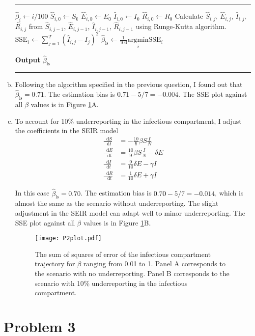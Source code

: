 \documentclass[12pt]{article}
\makeatletter
\newcommand*\diff{\mathop{}\!\mathrm{d}}
\newenvironment{breakablealgorithm}
{%
		\begin{center}
			\refstepcounter{algorithm}%
			\hrule height.8pt depth0pt \kern2pt%
			\renewcommand{\caption}[2][\relax]{%
				{\raggedright\textbf{\fname@algorithm~\thealgorithm} ##2\par}%
				\ifx\relax##1\relax %
				\addcontentsline{loa}{algorithm}{\protect\numberline{\thealgorithm}##2}%
				\else %
				\addcontentsline{loa}{algorithm}{\protect\numberline{\thealgorithm}##1}%
				\fi
				\kern2pt\hrule\kern2pt
			}
		}{%
		\kern2pt\hrule\relax%
	\end{center}
}
\makeatother
\begin{document}
\begin{enumerate}[(a)]
\begin{breakablealgorithm}
	\begin{algorithmic}[1]
		\State $\hat{\beta}_{i} \gets i/100$ 
		\State $\hat{S}_{i,0} \gets S_{0}$ 
		\State $\hat{E}_{i,0} \gets E_0$
		\State $\hat{I}_{i,0} \gets I_{0}$
		\State $\hat{R}_{i,0} \gets R_0$
				\State Calculate $\hat{S}_{i,j}$, $\hat{E}_{i,j}$, $\hat{I}_{i,j}$, $\hat{R}_{i,j}$ from $\hat{S}_{i,j-1}$, $\hat{E}_{i,j-1}$, $\hat{I}_{i,j-1}$, $\hat{R}_{i,j-1}$ using Runge-Kutta algorithm.
			\EndFor
		\State $\text{SSE}_{i} \gets \sum_{j=1}^{T} (\hat{I}_{i,j} - I_{j})^2$
		\EndFor
		\State $\hat{\beta}_\text{ls} \gets \frac{1}{100}\underset{i}{\mathrm{argmin}}\text{SSE}_{i}$	
	\end{algorithmic}
	
	\hspace*{\algorithmicindent} \textbf{Output} $\hat{\beta}_\text{ls}$
\end{breakablealgorithm}

	\item Following the algorithm specified in the previous question, I found out that $\hat{\beta}_\text{ls} = 0.71$. The estimation bias is $0.71 - 5/7 = -0.004$. The SSE plot against all $\beta$ values is in Figure \ref{p2}A.

	
	
	\item To account for 10\% underreporting in the infectious compartment, I adjust the coefficients in the SEIR model
	\begin{align*}
	\frac{\diff S}{\diff t} &= -\frac{10}{9} \beta S \frac{I}{N}\\
	\frac{\diff E}{\diff t} &= \frac{10}{9}\beta S \frac{I}{N} - \delta E\\
	\frac{\diff I}{\diff t} &= \frac{9}{10}\delta E - \gamma I\\
	\frac{\diff R}{\diff t} &= \frac{1}{10}\delta E + \gamma I
	\end{align*}
	
	In this case $\hat{\beta}_\text{ls} = 0.70$. The estimation bias is $0.70 - 5/7 = -0.014$, which is almost the same as the scenario without underreporting. The slight adjustment in the SEIR model can adapt well to minor underreporting. The SSE plot against all $\beta$ values is in Figure \ref{p2}B.
	
	\begin{figure}[htbp]
		\centering
		\texttt{[image: P2plot.pdf]}
		\caption{The sum of squares of error of the infectious compartment trajectory for $\beta$ ranging from 0.01 to 1. Panel A corresponds to the scenario with no underreporting. Panel B corresponds to the scenario with 10\% underreporting in the infectious compartment.}\label{p2}
	\end{figure}
\end{enumerate}




\section*{Problem 3}
\end{document}
